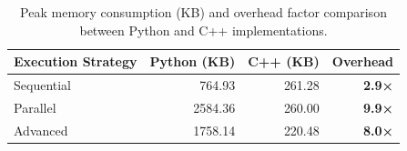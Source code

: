 
\begin{table}[htbp]
    \centering
    \caption{Peak memory consumption (KB) and overhead factor comparison between Python and C++ implementations.}
    \label{tab:cbn_memory_overhead}
    \begin{tabular}{lrrr}
        \hline
        \textbf{Execution Strategy} & \textbf{Python (KB)} & \textbf{C++ (KB)} & \textbf{Overhead} \\ \hline
        Sequential & 764.93 & 261.28 & \textbf{2.9×} \\
        Parallel   & 2584.36 & 260.00 & \textbf{9.9×} \\
        Advanced   & 1758.14 & 220.48 & \textbf{8.0×} \\ \hline
    \end{tabular}
\end{table}
